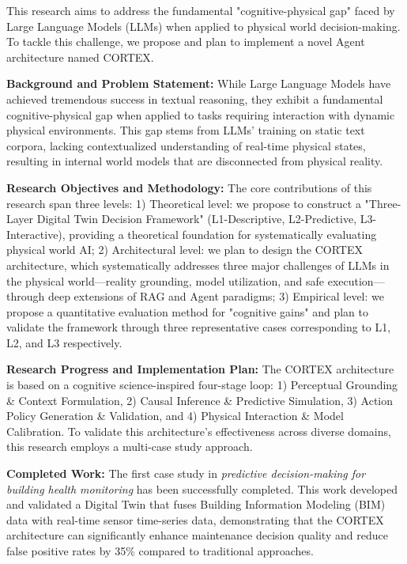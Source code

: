 
This research aims to address the fundamental "cognitive-physical gap" faced by Large Language Models (LLMs) when applied to physical world decision-making. To tackle this challenge, we propose and plan to implement a novel Agent architecture named CORTEX.

\textbf{Background and Problem Statement:} While Large Language Models have achieved tremendous success in textual reasoning, they exhibit a fundamental cognitive-physical gap when applied to tasks requiring interaction with dynamic physical environments. This gap stems from LLMs' training on static text corpora, lacking contextualized understanding of real-time physical states, resulting in internal world models that are disconnected from physical reality.

\textbf{Research Objectives and Methodology:} The core contributions of this research span three levels: 1) Theoretical level: we propose to construct a "Three-Layer Digital Twin Decision Framework" (L1-Descriptive, L2-Predictive, L3-Interactive), providing a theoretical foundation for systematically evaluating physical world AI; 2) Architectural level: we plan to design the CORTEX architecture, which systematically addresses three major challenges of LLMs in the physical world—reality grounding, model utilization, and safe execution—through deep extensions of RAG and Agent paradigms; 3) Empirical level: we propose a quantitative evaluation method for "cognitive gains" and plan to validate the framework through three representative cases corresponding to L1, L2, and L3 respectively.

\textbf{Research Progress and Implementation Plan:} The CORTEX architecture is based on a cognitive science-inspired four-stage loop: 1) Perceptual Grounding \& Context Formulation, 2) Causal Inference \& Predictive Simulation, 3) Action Policy Generation \& Validation, and 4) Physical Interaction \& Model Calibration. To validate this architecture's effectiveness across diverse domains, this research employs a multi-case study approach.

\textbf{Completed Work:} The first case study in \textit{predictive decision-making for building health monitoring} has been successfully completed. This work developed and validated a Digital Twin that fuses Building Information Modeling (BIM) data with real-time sensor time-series data, demonstrating that the CORTEX architecture can significantly enhance maintenance decision quality and reduce false positive rates by 35\% compared to traditional approaches.

